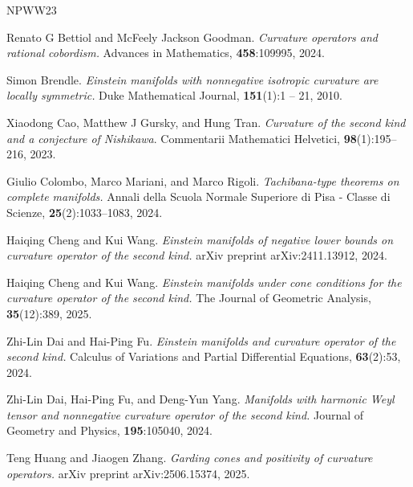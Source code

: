 \documentclass[11pt, reqno]{amsart}
\numberwithin{equation}{section}
\theoremstyle{definition}
\begin{document}
	\begin{thebibliography}{NPWW23}
		
		Renato G Bettiol and McFeely Jackson Goodman. \emph{Curvature operators and rational cobordism.}
		Advances in Mathematics, \textbf{458}:109995, 2024.
		
		Simon Brendle. \emph{Einstein manifolds with nonnegative isotropic curvature are locally symmetric.}
		Duke Mathematical Journal, \textbf{151}(1):1 – 21, 2010.
		
		Xiaodong Cao, Matthew J Gursky, and Hung Tran. \emph{Curvature of the second kind and a conjecture
			of Nishikawa}. Commentarii Mathematici Helvetici, \textbf{98}(1):195–216, 2023.
		
		Giulio Colombo, Marco Mariani, and Marco Rigoli. \emph{Tachibana-type theorems on complete manifolds.}
		Annali della Scuola Normale Superiore di Pisa - Classe di Scienze, \textbf{25}(2):1033–1083, 2024.
		
		Haiqing Cheng and Kui Wang. \emph{Einstein manifolds of negative lower bounds on curvature operator
			of the second kind.} arXiv preprint arXiv:2411.13912, 2024.
		
		Haiqing Cheng and Kui Wang. \emph{Einstein manifolds under cone conditions for the curvature operator
			of the second kind.} The Journal of Geometric Analysis, \textbf{35}(12):389, 2025.
		
		Zhi-Lin Dai and Hai-Ping Fu. \emph{Einstein manifolds and curvature operator of the second kind.}
		Calculus of Variations and Partial Differential Equations, \textbf{63}(2):53, 2024.
		
		Zhi-Lin Dai, Hai-Ping Fu, and Deng-Yun Yang. \emph{Manifolds with harmonic Weyl tensor and nonnegative
			curvature operator of the second kind.} Journal of Geometry and Physics, \textbf{195}:105040, 2024.
		
		
		Teng Huang and Jiaogen Zhang. \emph{Garding cones and positivity of curvature operators.} arXiv
		preprint arXiv:2506.15374, 2025.
		

\end{thebibliography}
\end{document}
